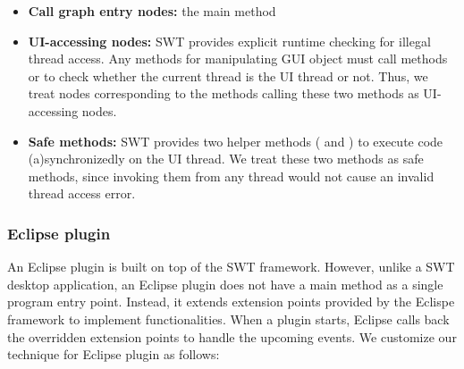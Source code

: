 \begin{itemize}

\item \textbf{Call graph entry nodes: } the main method

\item \textbf{UI-accessing nodes: } SWT provides explicit
runtime checking for illegal thread access. Any methods for manipulating
GUI object must call methods 
or  to check whether the current
thread is the UI thread or not.
Thus, we treat nodes corresponding to the methods
calling these two methods as UI-accessing nodes.

\item \textbf{Safe methods: } SWT provides two helper methods (
and ) to execute code (a)synchronizedly on the UI thread.
We treat these two methods as safe methods, since invoking
them from any thread 
would not cause an invalid thread access error.

\end{itemize}

\subsubsection{Eclipse plugin}

An Eclipse plugin is built on top of the SWT framework.
However, unlike a SWT desktop application, an Eclipse plugin does not
have a main method as a single program entry point. Instead, it extends
extension points provided by the Eclispe framework to implement
functionalities. When a plugin starts, Eclipse
calls back the overridden extension points to handle the
upcoming events. We customize our technique for Eclipse plugin as follows:


